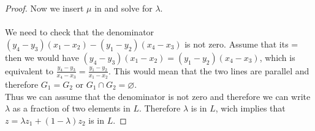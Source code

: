 \begin{proof}
    Now we insert $\mu$ in  and solve for $\lambda$.\\
    \\
    We need to check that the denominator $(y_4-y_3)(x_1 - x_2)- (y_1 - y_2)(x_4-x_3)$ is not zero.
    Assume that its = then we would have $(y_4-y_3)(x_1 - x_2) = (y_1 - y_2)(x_4-x_3)$, which is equivalent to $\frac{y_4-y_3}{x_4-x_3} = \frac{y_1 - y_2}{x_1 - x_2}$. 
    This would mean that the two lines are parallel and therefore $G_1 = G_2$ or $G_1 \cap G_2 = \varnothing$.\\
    Thus we can assume that the denominator is not zero and therefore we can write $\lambda$ as a fraction of two elements in $L$. Therefore $\lambda$ is in $L$, wich implies that $z = \lambda z_1 + (1-\lambda)z_2$ is in $L$.
\end{proof}

